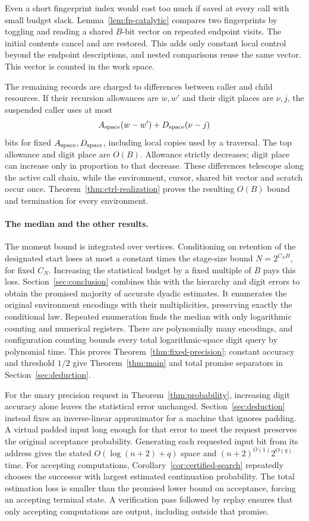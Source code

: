 Even a short fingerprint index would cost too much if saved at every
call with small budget slack. Lemma~\ref{lem:fp-catalytic} compares two fingerprints by toggling
and reading a shared $B$-bit vector on repeated endpoint visits. The
initial contents cancel and are restored. This adds only constant local
control beyond the endpoint descriptions, and nested comparisons reuse
the same vector. This vector is counted in the work space.

The remaining records are charged to differences between caller and
child resources. If their recursion allowances are $w,w'$ and their
digit places are $\nu,j$, the suspended caller uses at most
\[
                    A_{\rm space}(w-w')+D_{\rm space}(\nu-j)
\]
bits for fixed $A_{\rm space},D_{\rm space}$, including local copies used by a traversal.
The top allowance and digit place are $O(B)$. Allowance strictly
decreases; digit place can increase only in proportion to that decrease.
These differences telescope along the active call chain, while the
environment, cursor, shared bit vector and scratch occur once.
Theorem~\ref{thm:ctrl-realization} proves the resulting
$O(B)$ bound and termination for every environment.

\paragraph{The median and the other results.}
The moment bound is integrated over vertices. Conditioning on retention
of the designated start loses at most a constant times the stage-size
bound $N=2^{C_NB}$, for fixed $C_N$. Increasing the statistical budget by
a fixed multiple of $B$ pays this loss. Section~\ref{sec:conclusion}
combines this with the hierarchy and digit errors to obtain the promised
majority of accurate dyadic estimates. It enumerates the original
environment encodings with their multiplicities, preserving exactly
the conditional law. Repeated enumeration finds the median with only
logarithmic counting and numerical registers. There are polynomially
many encodings, and configuration counting bounds every total
logarithmic-space digit query by polynomial time. This proves
Theorem~\ref{thm:fixed-precision}; constant accuracy and threshold $1/2$
give Theorem~\ref{thm:main} and total promise separators in
Section~\ref{sec:deduction}.

For the unary precision request in Theorem~\ref{thm:probability},
increasing digit accuracy alone leaves the statistical error unchanged.
Section~\ref{sec:deduction} instead fixes an inverse-linear approximator
for a machine that ignores padding. A virtual padded input long enough
for that error to meet the request preserves the original acceptance
probability. Generating each requested input bit from its address gives
the stated $O(\log(n+2)+q)$ space and
$(n+2)^{O(1)}2^{O(q)}$ time. For accepting computations,
Corollary~\ref{cor:certified-search} repeatedly chooses the successor
with largest estimated continuation probability. The total estimation
loss is smaller than the promised lower bound on acceptance, forcing
an accepting terminal state. A verification pass followed by replay
ensures that only accepting computations are output, including outside
that promise.

